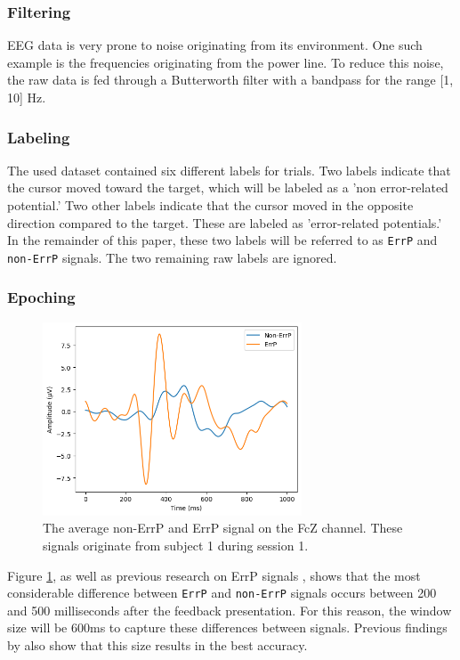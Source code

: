 \subsubsection{Filtering}

EEG data is very prone to noise originating from its environment. One such example is the frequencies originating from the power line. To reduce this noise, the raw data is fed through a Butterworth filter with a bandpass for the range [1, 10] Hz.

\subsubsection{Labeling}

The used dataset contained six different labels for trials. Two labels indicate that the cursor moved toward the target, which will be labeled as a 'non error-related potential.' Two other labels indicate that the cursor moved in the opposite direction compared to the target. These are labeled as 'error-related potentials.' In the remainder of this paper, these two labels will be referred to as \verb|ErrP| and \verb|non-ErrP| signals. The two remaining raw labels are ignored.

\subsubsection{Epoching}

\begin{figure}[!tbp]
    \centering
        \includegraphics[width=7.7cm]{img/FcZs1s1-1000ms.png}
    \caption{The average non-ErrP and ErrP signal on the FcZ channel. These signals originate from subject 1 during session 1.}
    \label{fig:FcZ}
\end{figure}

Figure \ref{fig:FcZ}, as well as previous research on ErrP signals \citep{lopes2021online, omedes2015analysis}, shows that the most considerable difference between \verb|ErrP| and \verb|non-ErrP| signals occurs between 200 and 500 milliseconds after the feedback presentation. For this reason, the window size will be 600ms to capture these differences between signals. Previous findings by \cite{correia2021error} also show that this size results in the best accuracy.


